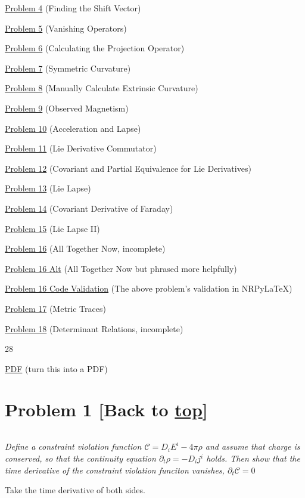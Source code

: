 \documentclass[landscape,letterpaper,10pt,english]{article}
\begin{document}
\hyperref[p4]{Problem 4} (Finding the Shift Vector)

\hyperref[p5]{Problem 5} (Vanishing Operators)

\hyperref[p6]{Problem 6} (Calculating the Projection Operator)

\hyperref[p7]{Problem 7} (Symmetric Curvature)

\hyperref[p8]{Problem 8} (Manually Calculate Extrinsic Curvature)

\hyperref[p9]{Problem 9} (Observed Magnetism)

\hyperref[p10]{Problem 10} (Acceleration and Lapse)

\hyperref[p11]{Problem 11} (Lie Derivative Commutator)

\hyperref[p12]{Problem 12} (Covariant and Partial Equivalence for Lie
Derivatives)

\hyperref[p13]{Problem 13} (Lie Lapse)

\hyperref[p14]{Problem 14} (Covariant Derivative of Faraday)

\hyperref[p15]{Problem 15} (Lie Lapse II)

\hyperref[p16]{Problem 16} (All Together Now, incomplete)

\hyperref[p16a]{Problem 16 Alt} (All Together Now but phrased more
helpfully)

\hyperref[p16c]{Problem 16 Code Validation} (The above problem's
validation in NRPyLaTeX)

\hyperref[p17]{Problem 17} (Metric Traces)

\hyperref[p18]{Problem 18} (Determinant Relations, incomplete)

28

\hyperref[latex_pdf_output]{PDF} (turn this into a PDF)

    \hypertarget{problem-1-back-to-top}{%
\section{\texorpdfstring{Problem 1 {[}Back to
\hyperref[toc]{top}{]}}{Problem 1 {[}Back to {]}}}\label{problem-1-back-to-top}}

\[\label{P1}\]

\emph{Define a constraint violation function
\(\mathcal{C} = D_iE^i - 4\pi\rho\) and assume that charge is conserved,
so that the continuity equation \(\partial_t \rho = -D_ij^i\) holds.
Then show that the time derivative of the constraint violation funciton
vanishes, \(\partial_t \mathcal{C} = 0\)}

    Take the time derivative of both sides.
\end{document}
